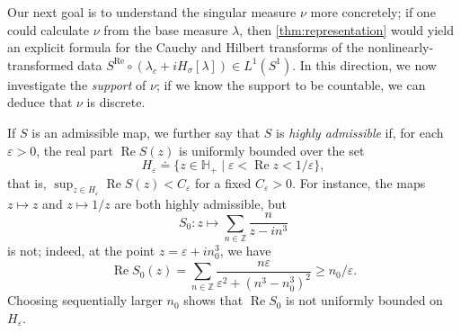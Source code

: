 \documentclass{cams-l} %
\newcommand{\ZZ}{\mathbb Z}
\newcommand{\HH}{\mathbb H}
\newcommand{\eps}{\varepsilon}
\newcommand{\op}{\operatorname}
\renewcommand{\Re}{\op{Re}}
\theoremstyle{definition}
\theoremstyle{remark}
\numberwithin{equation}{section}
\begin{document}
Our next goal is to understand the singular measure $\nu$ more concretely; if one could calculate $\nu$ from the base measure $\lambda$, then \cref{thm:representation} would yield an explicit formula for the Cauchy and Hilbert transforms of the nonlinearly-transformed data $S^{\Re}\circ(\lambda_c + iH_\sigma[\lambda])\in L^1(S^1)$. In this direction, we now investigate the \emph{support} of $\nu$; if we know the support to be countable, we can deduce that $\nu$ is discrete.

If $S$ is an admissible map, we further say that $S$ is \emph{highly admissible} if, for each $\eps>0$, the real part $\Re S(z)$ is uniformly bounded over the set
\[H_\eps\doteq \{z\in \HH_+\;|\;\eps < \Re z < 1/\eps\},\]
that is, $\sup_{z\in H_\eps} \Re S(z) < C_\eps$ for a fixed $C_\eps>0$. For instance, the maps $z\mapsto z$ and $z\mapsto 1/z$ are both highly admissible, but
\[S_0:z\mapsto \sum_{n\in\ZZ}\frac{n}{z-in^3}\]
is not; indeed, at the point $z=\eps+in_0^3$, we have
\[\Re S_0(z) = \sum_{n\in\ZZ}\frac{n\eps}{\eps^2+(n^3-n_0^3)^2}\geq n_0/\eps.\]
Choosing sequentially larger $n_0$ shows that $\Re S_0$ is not uniformly bounded on $H_\eps$.
\end{document}

